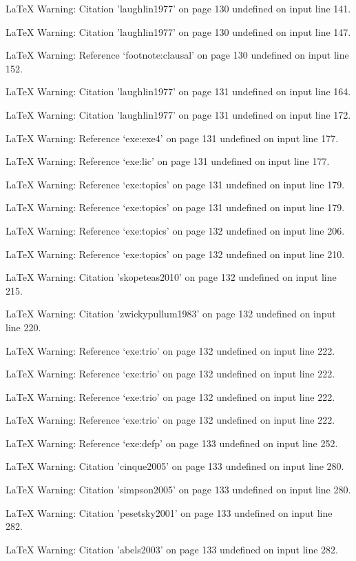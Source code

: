 LaTeX Warning: Citation 'laughlin1977' on page 130 undefined on input line 141.


LaTeX Warning: Citation 'laughlin1977' on page 130 undefined on input line 147.


LaTeX Warning: Reference `footnote:clausal' on page 130 undefined on input line 152.


LaTeX Warning: Citation 'laughlin1977' on page 131 undefined on input line 164.


LaTeX Warning: Citation 'laughlin1977' on page 131 undefined on input line 172.


LaTeX Warning: Reference `exe:exe4' on page 131 undefined on input line 177.


LaTeX Warning: Reference `exe:lic' on page 131 undefined on input line 177.


LaTeX Warning: Reference `exe:topics' on page 131 undefined on input line 179.


LaTeX Warning: Reference `exe:topics' on page 131 undefined on input line 179.


LaTeX Warning: Reference `exe:topics' on page 132 undefined on input line 206.


LaTeX Warning: Reference `exe:topics' on page 132 undefined on input line 210.


LaTeX Warning: Citation 'skopeteas2010' on page 132 undefined on input line 215.


LaTeX Warning: Citation 'zwickypullum1983' on page 132 undefined on input line 220.


LaTeX Warning: Reference `exe:trio' on page 132 undefined on input line 222.


LaTeX Warning: Reference `exe:trio' on page 132 undefined on input line 222.


LaTeX Warning: Reference `exe:trio' on page 132 undefined on input line 222.


LaTeX Warning: Reference `exe:trio' on page 132 undefined on input line 222.


LaTeX Warning: Reference `exe:defp' on page 133 undefined on input line 252.


LaTeX Warning: Citation 'cinque2005' on page 133 undefined on input line 280.


LaTeX Warning: Citation 'simpson2005' on page 133 undefined on input line 280.


LaTeX Warning: Citation 'pesetsky2001' on page 133 undefined on input line 282.


LaTeX Warning: Citation 'abels2003' on page 133 undefined on input line 282.


